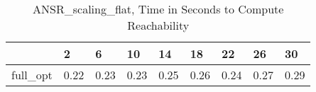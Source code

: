 \begin{table}
\caption{ANSR\_scaling\_flat, Time in Seconds to Compute Reachability}
\label{ANSR_scaling_flat_states_time}
\begin{tabular}{lllllllll}
\toprule
 & 2 & 6 & 10 & 14 & 18 & 22 & 26 & 30 \\
\midrule
full\_opt & 0.22 & 0.23 & 0.23 & 0.25 & 0.26 & 0.24 & 0.27 & 0.29 \\
\bottomrule
\end{tabular}
\end{table}
